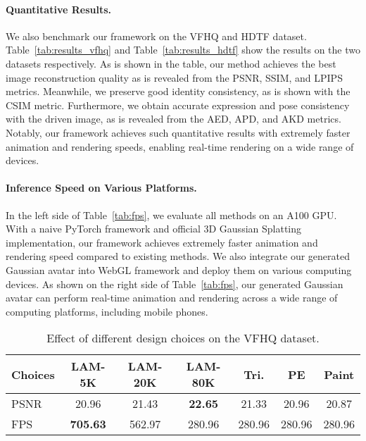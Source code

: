 \paragraph{\textbf{Quantitative Results.}}
We also benchmark our framework on the VFHQ and HDTF dataset. Table~\ref{tab:results_vfhq} and Table~\ref{tab:results_hdtf} show the results on the two datasets respectively. As is shown in the table, our method achieves the best image reconstruction quality as is revealed from the PSNR, SSIM, and LPIPS metrics. Meanwhile, we preserve good identity consistency, as is shown with the CSIM metric. Furthermore, we obtain accurate expression and pose consistency with the driven image, as is revealed from the AED, APD, and AKD metrics. Notably, our framework achieves such quantitative results with extremely faster animation and rendering speeds, enabling real-time rendering on a wide range of devices.

\paragraph{\textbf{Inference Speed on Various Platforms.}} In the left side of Table~\ref{tab:fps}, we evaluate all methods on an A100 GPU. With a naive PyTorch framework and official 3D Gaussian Splatting implementation, our framework achieves extremely faster animation and rendering speed compared to existing methods. We also integrate our generated Gaussian avatar into WebGL framework and deploy them on various computing devices. As shown on the right side of Table~\ref{tab:fps}, our generated Gaussian avatar can perform real-time animation and rendering across a wide range of computing platforms, including mobile phones.

\begin{table}
    \caption{Effect of different design choices on the VFHQ dataset.}
    \vspace{-.1in}
    \label{tab:ablation}
    \small
    \begin{tabular}{l|ccc|ccc}
        \toprule
        Choices & LAM-5K & LAM-20K & LAM-80K & Tri. & PE & Paint \\
        \midrule
        PSNR          & 20.96  & 21.43  & \textbf{22.65}  & 21.33 & 20.96 & 20.87 \\
        FPS           & \textbf{705.63}  & 562.97  & 280.96 & 280.96 & 280.96 & 280.96 \\
        \bottomrule
    \end{tabular}
\end{table}


